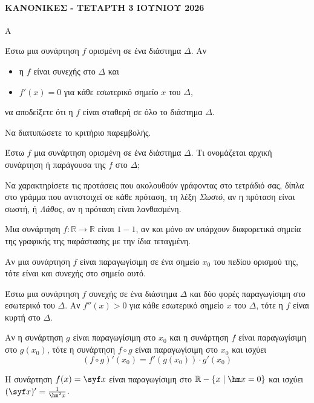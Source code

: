 \paragraph{ΚΑΝΟΝΙΚΕΣ - ΤΕΤΑΡΤΗ 3 ΙΟΥΝΙΟΥ 2026}
\begin{thema}{A} 
\begin{erwthma}
\item Έστω μια συνάρτηση $f$ ορισμένη σε ένα διάστημα $\Delta$. Αν
\begin{itemize}
    \item η $f$ είναι συνεχής στο $\Delta$ και
    \item $f'(x) = 0$ για κάθε εσωτερικό σημείο $x$ του $\Delta$,
\end{itemize}
να αποδείξετε ότι η $f$ είναι σταθερή σε όλο το διάστημα $\Delta$.
\item Να διατυπώσετε το κριτήριο παρεμβολής.

\item Έστω $f$ μια συνάρτηση ορισμένη σε ένα διάστημα $\Delta$. Τι ονομάζεται αρχική συνάρτηση ή παράγουσα της $f$ στο $\Delta$;

\item Να χαρακτηρίσετε τις προτάσεις που ακολουθούν γράφοντας στο τετράδιό σας, δίπλα στο γράμμα που αντιστοιχεί σε κάθε πρόταση, τη λέξη \textit{Σωστό}, αν η πρόταση είναι σωστή, ή \textit{Λάθος}, αν η πρόταση είναι λανθασμένη.

\begin{alist}
    \item Μια συνάρτηση $f: \mathbb{R} \to \mathbb{R}$ είναι $1-1$, αν και μόνο αν υπάρχουν διαφορετικά σημεία της γραφικής της παράστασης με την ίδια τεταγμένη.
    \item Αν μια συνάρτηση $f$ είναι παραγωγίσιμη σε ένα σημείο $x_0$ του πεδίου ορισμού της, τότε είναι και συνεχής στο σημείο αυτό.
    \item Έστω μια συνάρτηση $f$ συνεχής σε ένα διάστημα $\Delta$ και δύο φορές παραγωγίσιμη στο εσωτερικό του $\Delta$. Αν $f''(x) > 0$ για κάθε εσωτερικό σημείο $x$ του $\Delta$, τότε η $f$ είναι κυρτή στο $\Delta$.
    \item Αν η συνάρτηση $g$ είναι παραγωγίσιμη στο $x_0$ και η συνάρτηση $f$ είναι παραγωγίσιμη στο $g(x_0)$, τότε η συνάρτηση $f \circ g$ είναι παραγωγίσιμη στο $x_0$ και ισχύει
    \begin{equation*}
    (f \circ g)'(x_0) = f'(g(x_0)) \cdot g'(x_0)
    \end{equation*}
    \item[ε)] Η συνάρτηση $f(x) = \syf x$ είναι παραγωγίσιμη στο $\mathbb{R} - \{x \mid \hm x = 0\}$ και ισχύει $(\syf x)' = \frac{1}{\hm^2 x}$.
\end{alist}
\end{erwthma}
\end{thema}

